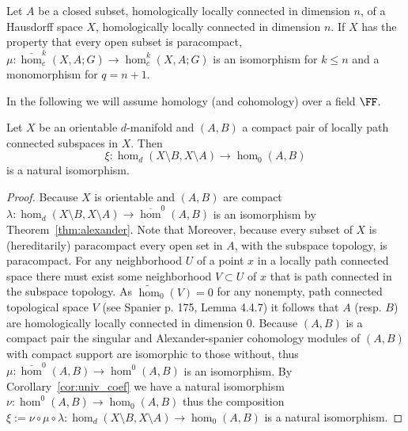 \begin{lemma}\label{lem:alexander_iso}
  Let $A$ be a closed subset, homologically locally connected in dimension $n$, of a Hausdorff space $X$, homologically locally connected in dimension $n$.
  If $X$ has the property that every open subset is paracompact, $\mu : \overline{\hom}_c^k(X,A; G)\to \hom_c^k(X, A; G)$ is an isomorphism for $k\leq n$ and a monomorphism for $q = n+1$.
\end{lemma}

In the following we will assume homology (and cohomology) over a field $\FF$.

\begin{lemma}\label{cor:alexander_iso}
  Let $X$ be an orientable $d$-manifold and $(A,B)$ a compact pair of locally path connected subspaces in $X$.
  Then
  \[\xi : \hom_d(X\setminus B, X\setminus  A)\to \hom_0(A, B)\]
  is a natural isomorphism.
\end{lemma}
\begin{proof}
  Because $X$ is orientable and $(A,B)$ are compact $\lambda : \hom_d(X\setminus B, X\setminus A)\to \overline{\hom}^{0}(A, B)$ is an isomorphism by Theorem~\ref{thm:alexander}.
  Note that
  Moreover, because every subset of $X$ is (hereditarily) paracompact every open set in $A$, with the subspace topology, is paracompact.
  For any neighborhood $U$ of a point $x$ in a locally path connected space there must exist some neighborhood $V\subset U$ of $x$ that is path connected in the subspace topology.
  As $\tilde{\hom}_0(V) = 0$ for any nonempty, path connected topological space $V$ (see Spanier p. 175, Lemma 4.4.7) it follows that $A$ (resp. $B$) are homologically locally connected in dimension $0$.
  Because $(A,B)$ is a compact pair the singular and Alexander-spanier cohomology modules of $(A,B)$ with compact support are isomorphic to those without, thus $\mu:\overline{\hom}^{0}(A, B)\to \hom^0(A, B)$ is an isomorphism.
  By Corollary~\ref{cor:univ_coef} we have a natural isomorphism $\nu : \hom^0(A, B)\to\hom_0(A, B)$ thus the composition $\xi := \nu\circ\mu\circ\lambda : \hom_d(X\setminus B, X\setminus  A)\to \hom_0(A, B)$ is a natural isomorphism.
\end{proof}

